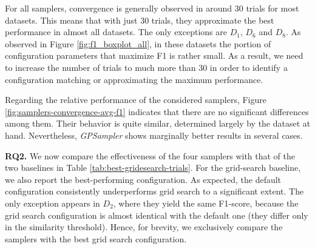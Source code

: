 
For all samplers, convergence is generally observed in around 30 trials for most datasets. This means that with just 30 trials, they approximate the best performance in almost all datasets.
The only exceptions are $D_1$, $D_6$ and $D_8$. As observed in Figure \ref{fig:f1_boxplot_all}, in these datasets the portion of configuration parameters that maximize F1 is rather small. As a result, we need to increase the number of trials to much more than 30 in order to identify a configuration matching or approximating the maximum performance.

Regarding the relative performance of the considered samplers, Figure \ref{fig:samplers-convergence-avg-f1} indicates that there are no significant differences among them. Their behavior is quite similar, determined largely by the dataset at hand. Nevertheless, \textit{GPSampler} shows marginally better results in several cases.

\textbf{RQ2.} We now compare the effectiveness of the four samplers with that of the two baselines in Table \ref{tab:best-gridesearch-trials}. 
For the grid-search baseline, we also report the best-performing configuration.
As expected, the default configuration consistently underperforms grid search to a significant extent. The only exception appears in $D_2$, where they yield the same F1-score, because the grid search configuration is almost identical with the default one (they differ only in the similarity threshold). Hence, for brevity, we exclusively compare the samplers with the best grid search configuration.


